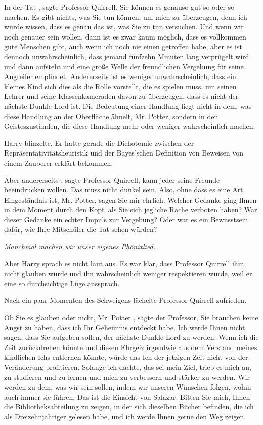 \glqq In der Tat\grqq{} , sagte Professor Quirrell. \glqq Sie können es genauso
gut so oder so machen. Es gibt nichts, was Sie tun können, um mich zu
überzeugen, denn ich würde wissen, dass es genau das ist, was Sie zu tun
versuchen. Und wenn wir noch genauer sein wollen, dann ist es zwar kaum möglich,
dass es vollkommen gute Menschen gibt, auch wenn ich noch nie einen getroffen
habe, aber es ist dennoch unwahrscheinlich, dass jemand fünfzehn Minuten lang
verprügelt wird und dann aufsteht und eine große Welle der freundlichen
Vergebung für seine Angreifer empfindet. Andererseits ist es weniger
unwahrscheinlich, dass ein kleines Kind sich dies als die Rolle vorstellt, die
es spielen muss, um seinen Lehrer und seine Klassenkameraden davon zu
überzeugen, dass es nicht der nächste Dunkle Lord ist. Die Bedeutung einer
Handlung liegt nicht in dem, was diese Handlung an der Oberfläche ähnelt, Mr.
Potter, sondern in den Geisteszuständen, die diese Handlung mehr oder weniger
wahrscheinlich machen.\grqq{}

Harry blinzelte. Er hatte gerade die Dichotomie zwischen der
Repräsentativitätsheuristik und der Bayes'schen Definition von Beweisen von
einem Zauberer erklärt bekommen.

\glqq Aber andererseits\grqq{} , sagte Professor Quirrell, \glqq kann jeder
seine Freunde beeindrucken wollen. Das muss nicht dunkel sein. Also, ohne dass
es eine Art Eingeständnis ist, Mr. Potter, sagen Sie mir ehrlich. Welcher
Gedanke ging Ihnen in dem Moment durch den Kopf, als Sie sich jegliche Rache
verboten haben? War dieser Gedanke ein echter Impuls zur Vergebung? Oder war es
ein Bewusstsein dafür, wie Ihre Mitschüler die Tat sehen würden?\grqq{}

\emph{ Manchmal machen wir unser eigenes Phönixlied.}

Aber Harry sprach es nicht laut aus. Es war klar, dass Professor Quirrell ihm
nicht glauben würde und ihn wahrscheinlich weniger respektieren würde, weil er
eine so durchsichtige Lüge aussprach.

Nach ein paar Momenten des Schweigens lächelte Professor Quirrell zufrieden.

\glqq Ob Sie es glauben oder nicht, Mr. Potter\grqq{} , sagte der Professor,
\glqq Sie brauchen keine Angst zu haben, dass ich Ihr Geheimnis entdeckt habe.
Ich werde Ihnen nicht sagen, dass Sie aufgeben sollen, der nächste Dunkle Lord
zu werden. Wenn ich die Zeit zurückdrehen könnte und diesen Ehrgeiz irgendwie
aus dem Verstand meines kindlichen Ichs entfernen könnte, würde das Ich der
jetzigen Zeit nicht von der Veränderung profitieren. Solange ich dachte, das sei
mein Ziel, trieb es mich an, zu studieren und zu lernen und mich zu verbessern
und stärker zu werden. Wir werden zu dem, was wir sein sollen, indem wir unseren
Wünschen folgen, wohin auch immer sie führen. Das ist die Einsicht von Salazar.
Bitten Sie mich, Ihnen die Bibliotheksabteilung zu zeigen, in der sich dieselben
Bücher befinden, die ich als Dreizehnjähriger gelesen habe, und ich werde Ihnen
gerne den Weg zeigen.\grqq{}

